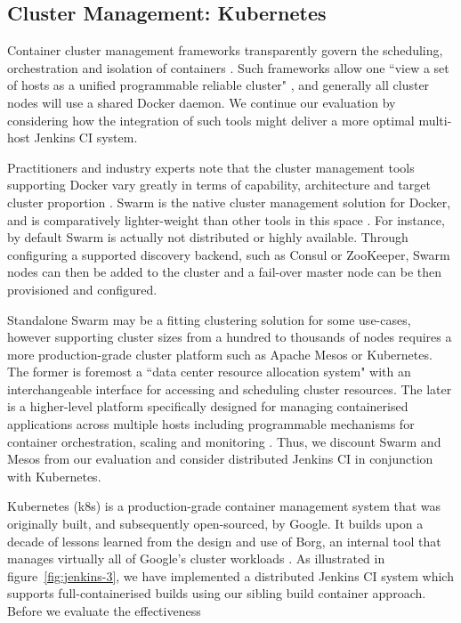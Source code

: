 \documentclass{report}
\begin{document}
\subsection{Cluster Management: Kubernetes}
Container cluster management frameworks transparently govern the
scheduling, orchestration and isolation of containers \citep{Rensin}. 
Such frameworks allow one ``view a set of hosts as a 
unified programmable reliable cluster" \citep{goasguen}, and generally all cluster nodes
will use a shared Docker daemon. We continue our evaluation by
considering how the integration of such tools might deliver a more optimal multi-host
Jenkins CI system.
\par
Practitioners and industry experts note that the cluster management tools supporting Docker
vary greatly in terms of capability, architecture and target cluster proportion
\citep{goasguen, holla}. Swarm is the native cluster management solution for 
Docker, and is comparatively lighter-weight than other tools in this space \citep{holla}.
For instance, by default Swarm is actually not distributed or highly available. 
Through configuring a supported discovery backend, such
as Consul or ZooKeeper, Swarm nodes can then be added to 
the cluster and a fail-over master node can be then provisioned and configured.
\par
Standalone Swarm may be a fitting clustering solution for some use-cases, however supporting
cluster sizes from a hundred to thousands of nodes requires a more production-grade 
cluster platform such as Apache Mesos or Kubernetes. 
The former is foremost a ``data center resource allocation system" with an 
interchangeable interface for accessing and scheduling cluster resources. 
The later is a higher-level platform specifically 
designed for managing containerised applications across multiple hosts including programmable mechanisms for container orchestration, scaling and monitoring  \citep{goasguen}.
Thus, we discount Swarm and Mesos from our evaluation and consider distributed
Jenkins CI in conjunction with Kubernetes. 
\par
Kubernetes (k8s) is a production-grade container management 
system that was originally built, and subsequently open-sourced, by Google.
It builds upon a decade of lessons learned from the design and use of Borg, 
an internal tool that manages virtually all of Google's cluster workloads \citep{Rensin}.
As illustrated in figure~\ref{fig:jenkins-3}, we have implemented a distributed
Jenkins CI system which supports full-containerised builds using 
our sibling build container approach. Before we evaluate the effectiveness
\end{document}
